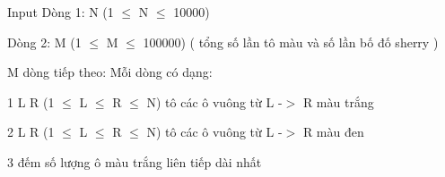 Input
Dòng 1: N (1  $\le$  N  $\le$  10000)  

   Dòng 2: M (1  $\le$  M  $\le$  100000) ( tổng số lần tô màu và số lần bố đố sherry )  

   M dòng tiếp theo: Mỗi dòng có dạng:  

   1  L  R  (1  $\le$  L  $\le$  R  $\le$  N) tô các ô vuông từ L -$>$ R màu trắng  

   2  L  R  (1  $\le$  L  $\le$  R  $\le$  N) tô các ô vuông từ L -$>$ R màu đen  

   3 đếm số lượng ô màu trắng liên tiếp dài nhất